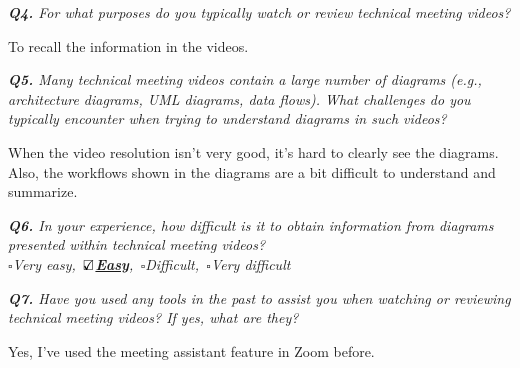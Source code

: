 \vspace*{1em}\noindent\textit{\textbf{Q4.} For what purposes do you typically watch or review technical meeting videos?
}
\begin{samepage}
\begin{mdframed}[style=MyFrame]
To recall the information in the videos.
\end{mdframed}
\end{samepage}



\vspace*{1em}\noindent\textit{\textbf{Q5.} Many technical meeting videos contain a large number of diagrams (e.g., architecture diagrams, UML diagrams, data flows). 
What challenges do you typically encounter when trying to understand diagrams in such videos?
}
\begin{samepage}
\begin{mdframed}[style=MyFrame]
When the video resolution isn't very good, it’s hard to clearly see the diagrams. Also, the workflows shown in the diagrams are a bit difficult to understand and summarize.
\end{mdframed}
\end{samepage}


\vspace*{1em}\noindent\textit{\textbf{Q6.} In your experience, how difficult is it to obtain information from diagrams presented within  technical meeting videos?
\\[.5em]
        \indent $\square$Very easy,\,
        \underline{\bfseries$\text{\rlap{$\checkmark$}}\square$Easy},\,
        $\square$Difficult,\,
        $\square$Very difficult
}



\vspace*{1em}\noindent\textit{\textbf{Q7.} Have you used any tools in the past to assist you when watching or reviewing technical meeting videos? If yes, what are they?
}


\begin{samepage}
\begin{mdframed}[style=MyFrame]
Yes, I’ve used the meeting assistant feature in Zoom before.
\end{mdframed}
\end{samepage}




